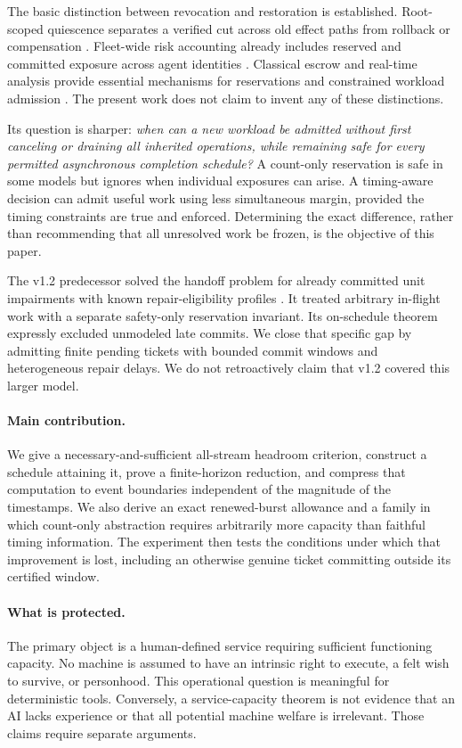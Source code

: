 \documentclass[11pt,a4paper]{article}
\theoremstyle{definition}\newtheorem{definition}{Definition}
\begin{document}
The basic distinction between revocation and restoration is established. Root-scoped quiescence separates a verified cut across old effect paths from rollback or compensation \cite{quiescence}. Fleet-wide risk accounting already includes reserved and committed exposure across agent identities \cite{risk}. Classical escrow and real-time analysis provide essential mechanisms for reservations and constrained workload admission \cite{escrow,rtc}. The present work does not claim to invent any of these distinctions.

Its question is sharper: \emph{when can a new workload be admitted without first canceling or draining all inherited operations, while remaining safe for every permitted asynchronous completion schedule?} A count-only reservation is safe in some models but ignores when individual exposures can arise. A timing-aware decision can admit useful work using less simultaneous margin, provided the timing constraints are true and enforced. Determining the exact difference, rather than recommending that all unresolved work be frozen, is the objective of this paper.

The v1.2 predecessor solved the handoff problem for already committed unit impairments with known repair-eligibility profiles \cite{prior}. It treated arbitrary in-flight work with a separate safety-only reservation invariant. Its on-schedule theorem expressly excluded unmodeled late commits. We close that specific gap by admitting finite pending tickets with bounded commit windows and heterogeneous repair delays. We do not retroactively claim that v1.2 covered this larger model.

\paragraph{Main contribution.}
We give a necessary-and-sufficient all-stream headroom criterion, construct a schedule attaining it, prove a finite-horizon reduction, and compress that computation to event boundaries independent of the magnitude of the timestamps. We also derive an exact renewed-burst allowance and a family in which count-only abstraction requires arbitrarily more capacity than faithful timing information. The experiment then tests the conditions under which that improvement is lost, including an otherwise genuine ticket committing outside its certified window.

\paragraph{What is protected.}
The primary object is a human-defined service requiring sufficient functioning capacity. No machine is assumed to have an intrinsic right to execute, a felt wish to survive, or personhood. This operational question is meaningful for deterministic tools. Conversely, a service-capacity theorem is not evidence that an AI lacks experience or that all potential machine welfare is irrelevant. Those claims require separate arguments.
\end{document}
